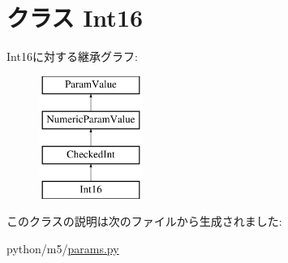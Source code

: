\hypertarget{classm5_1_1params_1_1Int16}{
\section{クラス Int16}
\label{classm5_1_1params_1_1Int16}
}
Int16に対する継承グラフ:\begin{figure}[H]
\begin{center}
\leavevmode
\includegraphics[height=4cm]{classm5_1_1params_1_1Int16}
\end{center}
\end{figure}


このクラスの説明は次のファイルから生成されました:\begin{DoxyCompactItemize}
\item 
python/m5/\hyperlink{params_8py}{params.py}\end{DoxyCompactItemize}
